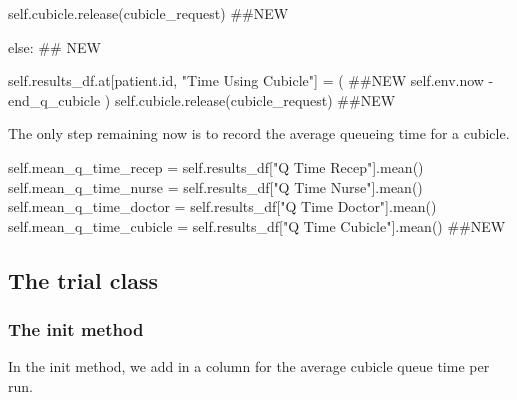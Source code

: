 \documentclass[
  letterpaper,
  DIV=11,
  numbers=noendperiod]{scrreprt}
\newenvironment{Shaded}{}{}
\newcommand{\BuiltInTok}[1]{\textcolor[rgb]{0.84,0.23,0.29}{#1}}
\newcommand{\CommentTok}[1]{\textcolor[rgb]{0.42,0.45,0.49}{#1}}
\newcommand{\ControlFlowTok}[1]{\textcolor[rgb]{0.84,0.23,0.29}{#1}}
\newcommand{\NormalTok}[1]{\textcolor[rgb]{0.14,0.16,0.18}{#1}}
\newcommand{\OperatorTok}[1]{\textcolor[rgb]{0.14,0.16,0.18}{#1}}
\newcommand{\StringTok}[1]{\textcolor[rgb]{0.01,0.18,0.38}{#1}}
\newcommand{\VariableTok}[1]{\textcolor[rgb]{0.89,0.38,0.04}{#1}}
\begin{document}
\begin{Shaded}
\begin{Highlighting}[]
        \VariableTok{self}\NormalTok{.cubicle.release(cubicle\_request) }\CommentTok{\#\#NEW}


\ControlFlowTok{else}\NormalTok{: }\CommentTok{\#\# NEW}

      \VariableTok{self}\NormalTok{.results\_df.at[patient.}\BuiltInTok{id}\NormalTok{, }\StringTok{"Time Using Cubicle"}\NormalTok{] }\OperatorTok{=}\NormalTok{ (  }\CommentTok{\#\#NEW}
            \VariableTok{self}\NormalTok{.env.now }\OperatorTok{{-}}\NormalTok{ end\_q\_cubicle}
\NormalTok{            )}
      \VariableTok{self}\NormalTok{.cubicle.release(cubicle\_request) }\CommentTok{\#\#NEW}
\end{Highlighting}
\end{Shaded}

The only step remaining now is to record the average queueing time for a
cubicle.

\begin{Shaded}
\begin{Highlighting}[]
\VariableTok{self}\NormalTok{.mean\_q\_time\_recep }\OperatorTok{=} \VariableTok{self}\NormalTok{.results\_df[}\StringTok{"Q Time Recep"}\NormalTok{].mean()}
\VariableTok{self}\NormalTok{.mean\_q\_time\_nurse }\OperatorTok{=} \VariableTok{self}\NormalTok{.results\_df[}\StringTok{"Q Time Nurse"}\NormalTok{].mean()}
\VariableTok{self}\NormalTok{.mean\_q\_time\_doctor }\OperatorTok{=} \VariableTok{self}\NormalTok{.results\_df[}\StringTok{"Q Time Doctor"}\NormalTok{].mean()}
\VariableTok{self}\NormalTok{.mean\_q\_time\_cubicle }\OperatorTok{=} \VariableTok{self}\NormalTok{.results\_df[}\StringTok{"Q Time Cubicle"}\NormalTok{].mean() }\CommentTok{\#\#NEW}
\end{Highlighting}
\end{Shaded}

\subsection{The trial class}\label{the-trial-class-9}

\subsubsection{\texorpdfstring{The \textbf{init}
method}{The init method}}\label{the-init-method-11}

In the init method, we add in a column for the average cubicle queue
time per run.
\end{document}
